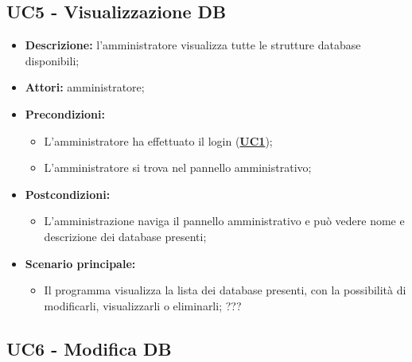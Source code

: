 \subsection{UC5 - Visualizzazione DB}
\label{sec:UC5}
\begin{itemize}
	\item \textbf{Descrizione:} l’amministratore visualizza tutte le strutture database disponibili;
	\item \textbf{Attori:} amministratore;
	\item \textbf{Precondizioni:} 
	\begin{itemize}
		\item L’amministratore ha effettuato il login (\hyperref[sec:UC1]{\textbf{UC1}});
		\item L’amministratore si trova nel pannello amministrativo;
	\end{itemize}
	\item \textbf{Postcondizioni:} 
	\begin{itemize}
		\item L'amministrazione naviga il pannello amministrativo e può vedere nome e descrizione dei database presenti;
	\end{itemize}
	\item \textbf{Scenario principale:} 
	\begin{itemize}
		\item Il programma visualizza la lista dei database presenti, con la possibilità di modificarli, visualizzarli o eliminarli; ???
	\end{itemize}
\end{itemize}

\subsection{UC6 - Modifica DB}
\label{sec:UC6}

